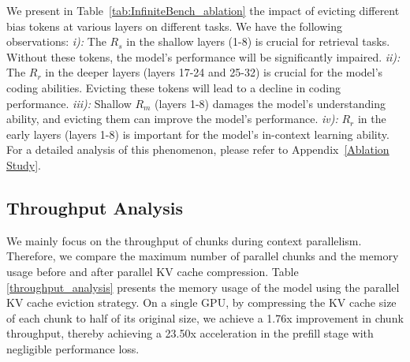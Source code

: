 We present in Table~\ref{tab:InfiniteBench_ablation} the impact of evicting different bias tokens at various layers on different tasks. We have the following observations: \textit{i):} The \(R_s\) in the shallow layers (1-8) is crucial for retrieval tasks. Without these tokens, the model's performance will be significantly impaired. \textit{ii):} The \(R_r\) in the deeper layers (layers 17-24 and 25-32) is crucial for the model's coding abilities. Evicting these tokens will lead to a decline in coding performance. \textit{iii):} Shallow \(R_m\) (layers 1-8) damages the model's understanding ability, and evicting them can improve the model's performance. \textit{iv):} \(R_r\) in the early layers (layers 1-8) is important for the model's in-context learning ability. For a detailed analysis of this phenomenon, please refer to Appendix~\ref{Ablation Study}.



\subsection{Throughput Analysis}
 We mainly focus on the throughput of chunks during context parallelism. Therefore, we compare the maximum number of parallel chunks and the memory usage before and after parallel KV cache compression. Table \ref{throughput_analysis} presents the memory usage of the model using the parallel KV cache eviction strategy. On a single GPU, by compressing the KV cache size of each chunk to half of its original size, we achieve a 1.76x improvement in chunk throughput, thereby achieving a 23.50x acceleration in the prefill stage with negligible performance loss. 

